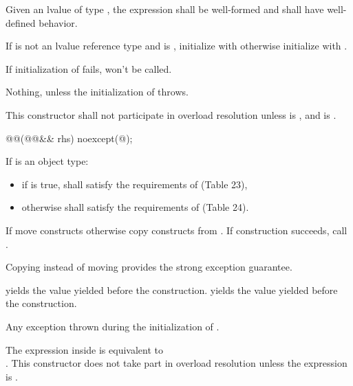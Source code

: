 \documentclass[ebook,11pt,article]{memoir}
\begin{document}
\begin{itemdescr}
\pnum
\requires Given an lvalue  of type , the expression  shall be well-formed and shall have well-defined behavior.

\pnum
\effects If  is not an lvalue reference type and  is , initialize   with  otherwise initialize  with . 
\begin{note}
If initialization of  fails,  won't be called.
\end{note}

\pnum
\throws Nothing, unless the initialization of  throws.

\pnum
\remarks This constructor shall not participate in overload resolution unless 
 is , and
 is .
\end{itemdescr}

\newpage
\begin{itemdecl}
@@(@@&& rhs) noexcept(@\seebelow@);
\end{itemdecl}

\begin{itemdescr}
\pnum
\requires
If  is an object type:
\begin{itemize}
 \item
if  is true,  shall satisfy the requirements of  (Table 23), 
\item
otherwise  shall satisfy the requirements of  (Table 24).
\end{itemize}

\pnum
\effects %
If  move constructs otherwise copy constructs  from . If construction succeeds, call .
\begin{note}
Copying instead of moving provides the strong exception guarantee.
\end{note}


\pnum
\postconditions
{} yields the value  yielded before the construction. 
 yields the value  yielded before the construction.

\pnum
\throws Any exception thrown during the initialization of .

\pnum
\remarks 
The expression inside  is equivalent to \\
.
This constructor does not take part in overload resolution unless the expression 
is .
\end{itemdescr}
\end{document}

